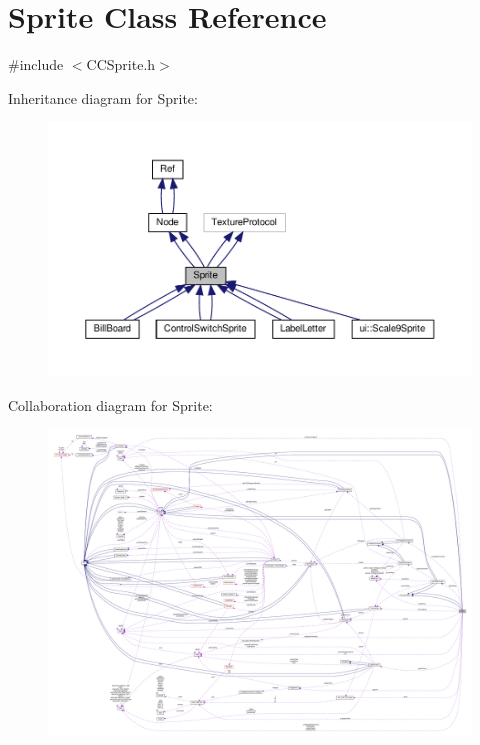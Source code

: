 \hypertarget{classSprite}{}\section{Sprite Class Reference}
\label{classSprite}


{\ttfamily \#include $<$C\+C\+Sprite.\+h$>$}



Inheritance diagram for Sprite\+:
\nopagebreak
\begin{figure}[H]
\begin{center}
\leavevmode
\includegraphics[width=350pt]{classSprite__inherit__graph}
\end{center}
\end{figure}


Collaboration diagram for Sprite\+:
\nopagebreak
\begin{figure}[H]
\begin{center}
\leavevmode
\includegraphics[width=350pt]{classSprite__coll__graph}
\end{center}
\end{figure}
